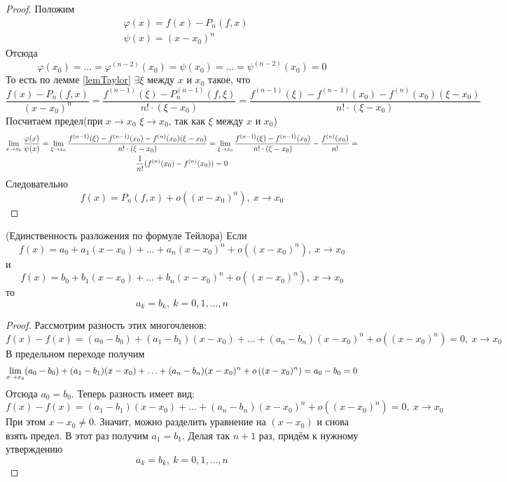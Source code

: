 \begin{proof}
	Положим
	\begin{align*}
		&\varphi(x) = f(x) - P_n(f, x)
		\\
		&\psi(x) = (x - x_0)^n
	\end{align*}
	Отсюда
	\[
		\varphi(x_0) = \ldots = \varphi^{(n - 2)}(x_0) =
		\psi(x_0) = \ldots = \psi^{(n - 2)}(x_0) = 0
	\]
	То есть по лемме \ref{lemTaylor} $\exists \xi$ между
	$x$ и $x_0$ такое, что
	\[
		\frac{f(x) - P_n(f, x)}{(x - x_0)^n} =
		\frac{f^{(n - 1)}(\xi) - P_n^{(n - 1)}(f, \xi)}
		{n! \cdot (\xi - x_0)} = \frac{f^{(n - 1)}
		(\xi) - f^{(n - 1)}(x_0) - f^{(n)}(x_0)(\xi - x_0)}
		{n! \cdot (\xi - x_0)}
	\]
	Посчитаем предел(при $x \to x_0$ $\xi \to x_0$, так как
	$\xi$  между $x$ и $x_0$)
	\begin{multline*}
		\lim\limits_{x \to x_0} \frac{\varphi(x)}{\psi(x)} =
		\lim\limits_{\xi \to x_0} \frac{f^{(n - 1)}(\xi) -
		f^{(n - 1)}(x_0) - f^{(n)}(x_0)(\xi - x_0)}
		{n! \cdot (\xi - x_0)} = \lim\limits_{\xi \to x_0}
		\frac{f^{(n - 1)}(\xi) - f^{(n - 1)}(x_0)}
		{n! \cdot (\xi - x_0)} - \frac{f^{(n)}(x_0)}{n!} = \\ 
		\frac{1}{n!}(f^{(n)}(x_0) - f^{(n)}(x_0)) = 0
	\end{multline*}
	Следовательно
	\[
		f(x) = P_n(f, x) + o((x - x_0)^n),\ x \to x_0
	\]
\end{proof}

\begin{theorem} (Единственность разложения по формуле Тейлора)
	Если 
	\[
		f(x) = a_0 + a_1(x - x_0) + \ldots +
		a_n(x - x_0)^n + o\left((x - x_0)^n\right),
		\ x \to x_0
    \]
    и 
    \[
    	f(x) = b_0 + b_1(x - x_0) + \ldots +
		b_n(x - x_0)^n + o\left((x - x_0)^n\right),
		\ x \to x_0
    \] то
	\[
		a_k = b_k,\ k = 0, 1, \ldots, n
	\]
\end{theorem}

\begin{proof}
	Рассмотрим разность этих многочленов:
	\[
		f(x) - f(x) = (a_0 - b_0) + (a_1 - b_1)(x - x_0) +
		\ldots + (a_n - b_n)(x - x_0)^n + 
		o\left((x - x_0)^n\right) = 0,\ x \to x_0
	\]
	В предельном переходе получим
	\[
		\lim\limits_{x \to x_0} (a_0 - b_0) + (a_1 - b_1)(x - x_0) +
		\ldots + (a_n - b_n)(x - x_0)^n +
		o\left((x - x_0)^n\right) = a_0 - b_0 = 0
	\]
	Отсюда $a_0 = b_0$. Теперь разность имеет вид:
	\[
		f(x) - f(x) = (a_1 - b_1)(x - x_0) + \ldots +
		(a_n - b_n)(x - x_0)^n + o((x - x_0)^n) = 0,
		\ x \to x_0
	\]
	При этом $x - x_0 \neq 0$. Значит, можно разделить
	уравнение на $(x - x_0)$ и снова взять предел. В
	этот раз получим $a_1 = b_1$. Делая так $n + 1$ раз,
	придём к нужному утверждению
	\[
		a_k = b_k,\ k = 0, 1, \ldots, n
	\]
\end{proof}

